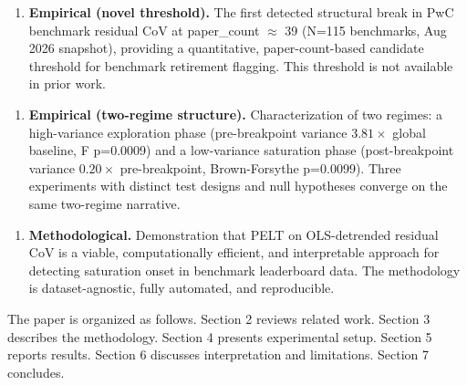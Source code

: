 \begin{enumerate}
\item \textbf{Empirical (novel threshold).} The first detected structural break in PwC benchmark residual CoV at paper\_count\* $\approx$ 39 (N=115 benchmarks, Aug 2026 snapshot), providing a quantitative, paper-count-based candidate threshold for benchmark retirement flagging. This threshold is not available in prior work.
\end{enumerate}

\begin{enumerate}
\item \textbf{Empirical (two-regime structure).} Characterization of two regimes: a high-variance exploration phase (pre-breakpoint variance 3.$81\times$ global baseline, F p=0.0009) and a low-variance saturation phase (post-breakpoint variance 0.$20\times$ pre-breakpoint, Brown-Forsythe p=0.0099). Three experiments with distinct test designs and null hypotheses converge on the same two-regime narrative.
\end{enumerate}

\begin{enumerate}
\item \textbf{Methodological.} Demonstration that PELT on OLS-detrended residual CoV is a viable, computationally efficient, and interpretable approach for detecting saturation onset in benchmark leaderboard data. The methodology is dataset-agnostic, fully automated, and reproducible.
\end{enumerate}

The paper is organized as follows. Section 2 reviews related work. Section 3 describes the methodology. Section 4 presents experimental setup. Section 5 reports results. Section 6 discusses interpretation and limitations. Section 7 concludes.

